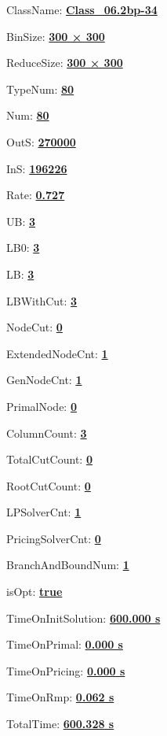 \documentclass[11pt]{article}
\begin{document}
\pagestyle{empty}


ClassName: \underline{\textbf{Class_06.2bp-34}}
\par
BinSize: \underline{\textbf{300 × 300}}
\par
ReduceSize: \underline{\textbf{300 × 300}}
\par
TypeNum: \underline{\textbf{80}}
\par
Num: \underline{\textbf{80}}
\par
OutS: \underline{\textbf{270000}}
\par
InS: \underline{\textbf{196226}}
\par
Rate: \underline{\textbf{0.727}}
\par
UB: \underline{\textbf{3}}
\par
LB0: \underline{\textbf{3}}
\par
LB: \underline{\textbf{3}}
\par
LBWithCut: \underline{\textbf{3}}
\par
NodeCut: \underline{\textbf{0}}
\par
ExtendedNodeCnt: \underline{\textbf{1}}
\par
GenNodeCnt: \underline{\textbf{1}}
\par
PrimalNode: \underline{\textbf{0}}
\par
ColumnCount: \underline{\textbf{3}}
\par
TotalCutCount: \underline{\textbf{0}}
\par
RootCutCount: \underline{\textbf{0}}
\par
LPSolverCnt: \underline{\textbf{1}}
\par
PricingSolverCnt: \underline{\textbf{0}}
\par
BranchAndBoundNum: \underline{\textbf{1}}
\par
isOpt: \underline{\textbf{true}}
\par
TimeOnInitSolution: \underline{\textbf{600.000 s}}
\par
TimeOnPrimal: \underline{\textbf{0.000 s}}
\par
TimeOnPricing: \underline{\textbf{0.000 s}}
\par
TimeOnRmp: \underline{\textbf{0.062 s}}
\par
TotalTime: \underline{\textbf{600.328 s}}
\par
\newpage
\end{document}
